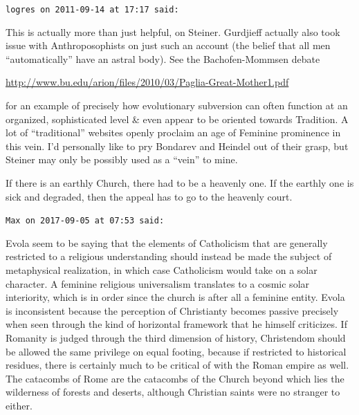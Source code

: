 \begin{footnotesize}
\begin{sffamily}
\texttt{logres on 2011-09-14 at 17:17 said:}

This is actually more than just helpful, on Steiner. Gurdjieff actually also took issue with Anthroposophists on just such an account (the belief that all men ``automatically'' have an astral body). See the Bachofen-Mommsen debate

\url{http://www.bu.edu/arion/files/2010/03/Paglia-Great-Mother1.pdf}

for an example of precisely how evolutionary subversion can often function at an organized, sophisticated level \& even appear to be oriented towards Tradition. A lot of ``traditional'' websites openly proclaim an age of Feminine prominence in this vein. I'd personally like to pry Bondarev and Heindel out of their grasp, but Steiner may only be possibly used as a ``vein'' to mine.

If there is an earthly Church, there had to be a heavenly one. If the earthly one is sick and degraded, then the appeal has to go to the heavenly court.

\hfill

\texttt{Max on 2017-09-05 at 07:53 said:}

Evola seem to be saying that the elements of Catholicism that are generally restricted to a religious understanding should instead be made the subject of metaphysical realization, in which case Catholicism would take on a solar character. A feminine religious universalism translates to a cosmic solar interiority, which is in order since the church is after all a feminine entity. Evola is inconsistent because the perception of Christianty becomes passive precisely when seen through the kind of horizontal framework that he himself criticizes. If Romanity is judged through the third dimension of history, Christendom should be allowed the same privilege on equal footing, because if restricted to historical residues, there is certainly much to be critical of with the Roman empire as well. The catacombs of Rome are the catacombs of the Church beyond which lies the wilderness of forests and deserts, although Christian saints were no stranger to either.


\hfill

\end{sffamily}
\end{footnotesize}

